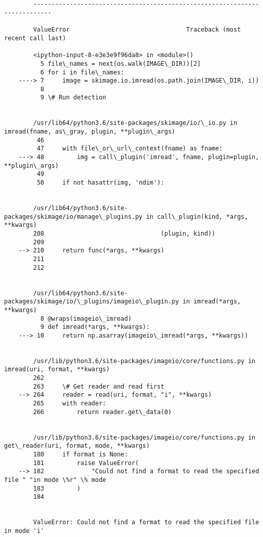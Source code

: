 \documentclass[11pt]{article}
\begin{document}
    \begin{center}
    \end{center}
    { \hspace*{\fill} \\}
    
    \begin{Verbatim}[commandchars=\\\{\}]

        ---------------------------------------------------------------------------

        ValueError                                Traceback (most recent call last)

        <ipython-input-8-e3e3e9f96da8> in <module>()
          5 file\_names = next(os.walk(IMAGE\_DIR))[2]
          6 for i in file\_names:
    ----> 7     image = skimage.io.imread(os.path.join(IMAGE\_DIR, i))
          8 
          9 \# Run detection


        /usr/lib64/python3.6/site-packages/skimage/io/\_io.py in imread(fname, as\_gray, plugin, **plugin\_args)
         46 
         47     with file\_or\_url\_context(fname) as fname:
    ---> 48         img = call\_plugin('imread', fname, plugin=plugin, **plugin\_args)
         49 
         50     if not hasattr(img, 'ndim'):


        /usr/lib64/python3.6/site-packages/skimage/io/manage\_plugins.py in call\_plugin(kind, *args, **kwargs)
        208                                (plugin, kind))
        209 
    --> 210     return func(*args, **kwargs)
        211 
        212 


        /usr/lib64/python3.6/site-packages/skimage/io/\_plugins/imageio\_plugin.py in imread(*args, **kwargs)
          8 @wraps(imageio\_imread)
          9 def imread(*args, **kwargs):
    ---> 10     return np.asarray(imageio\_imread(*args, **kwargs))
    

        /usr/lib/python3.6/site-packages/imageio/core/functions.py in imread(uri, format, **kwargs)
        262 
        263     \# Get reader and read first
    --> 264     reader = read(uri, format, "i", **kwargs)
        265     with reader:
        266         return reader.get\_data(0)


        /usr/lib/python3.6/site-packages/imageio/core/functions.py in get\_reader(uri, format, mode, **kwargs)
        180     if format is None:
        181         raise ValueError(
    --> 182             "Could not find a format to read the specified file " "in mode \%r" \% mode
        183         )
        184 


        ValueError: Could not find a format to read the specified file in mode 'i'

    \end{Verbatim}
\end{document}
